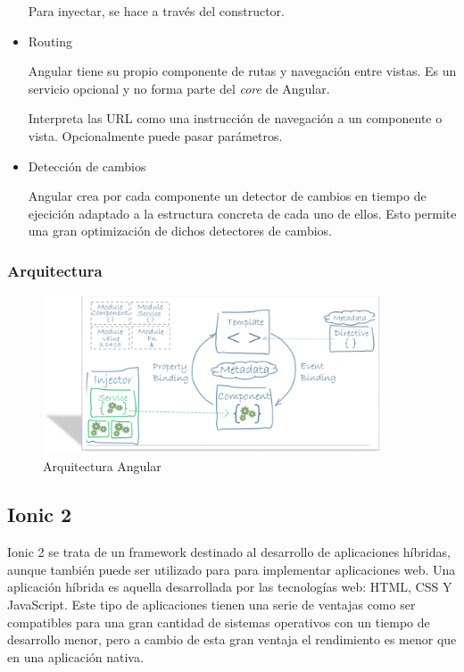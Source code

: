 \documentclass[a4paper, 12pt]{book}
\begin{document}
\begin{itemize}
Para inyectar, se hace a trav\'es del constructor.

\item Routing

Angular tiene su propio componente de rutas y navegaci\'on entre vistas. Es un servicio opcional y no forma parte del \emph{core} de Angular. 

Interpreta las URL como una instrucci\'on de navegaci\'on a un componente o vista. Opcionalmente puede pasar par\'ametros.

\item Detecci\'on de cambios

Angular crea por cada componente un detector de cambios en tiempo de ejecici\'on adaptado a la estructura concreta de cada uno de ellos. Esto permite una gran optimizaci\'on de dichos detectores de cambios.

\end{itemize}


\subsubsection{Arquitectura}
\label{subsec:arquitectura_angular}

\begin{figure}[H]
  \centering
  \includegraphics[width=10cm, keepaspectratio]{img/arq_angular}
  \caption{Arquitectura Angular}
  \label{figura:arq_angular}
\end{figure}


\subsection{Ionic 2}
\label{subsec:ionic}

Ionic 2\cite{Ionic} se trata de un framework destinado al desarrollo de aplicaciones h\'ibridas, aunque tambi\'en
puede ser utilizado para para implementar aplicaciones web. Una aplicaci\'on h\'ibrida es aquella
desarrollada por las tecnolog\'ias web: HTML, CSS Y JavaScript. Este tipo de aplicaciones tienen
una serie de ventajas como ser compatibles para una gran cantidad de sistemas operativos con
un tiempo de desarrollo menor, pero a cambio de esta gran ventaja el rendimiento es menor que
en una aplicaci\'on nativa.
\end{document}
